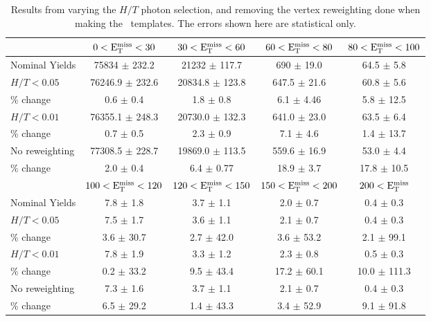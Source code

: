 \begin{table}[htb]
\scriptsize
\begin{center}
\caption{\label{table:photonsystematics} Results from varying the $H/T$ photon selection, and removing the vertex reweighting done when making the \MET\ templates. 
The errors shown here are statistical only.}
\begin{tabular}{l|c|c|c|c}
\hline
\hline
               & $0 < \rm{E_{T}^{miss}} < 30$     & $30 < \rm{E_{T}^{miss}} < 60$  & $60 < \rm{E_{T}^{miss}} < 80$ & $80 < \rm{E_{T}^{miss}} < 100$  \\ 
\hline
Nominal Yields & 75834 $\pm$ 232.2 & 21232   $\pm$ 117.7 & 690 $\pm$ 19.0   & 64.5 $\pm$ 5.8 \\
\hline
$H/T < 0.05$   & 76246.9 $\pm$ 232.6 & 20834.8 $\pm$ 123.8 &  647.5 $\pm$ 21.6 &    60.8 $\pm$ 5.6 \\
\% change      & 0.6 $\pm$ 0.4 &    1.8 $\pm$ 0.8 &    6.1 $\pm$ 4.46 &   5.8 $\pm$ 12.5 \\
\hline
$H/T < 0.01$   & 76355.1 $\pm$ 248.3 & 20730.0 $\pm$ 132.3 &  641.0 $\pm$ 23.0 &    63.5 $\pm$ 6.4 \\
\% change      & 0.7 $\pm$ 0.5 &    2.3 $\pm$ 0.9 &    7.1 $\pm$ 4.6 &   1.4 $\pm$ 13.7 \\
\hline
No reweighting & 77308.5 $\pm$ 228.7 & 19869.0 $\pm$ 113.5 &  559.6 $\pm$ 16.9 &    53.0 $\pm$ 4.4 \\
\% change      & 2.0 $\pm$ 0.4 &    6.4 $\pm$ 0.77 &   18.9 $\pm$ 3.7 &  17.8 $\pm$ 10.5 \\
\hline
\hline
          & $100 < \rm{E_{T}^{miss}} < 120$  & $120 < \rm{E_{T}^{miss}} < 150$  & $150 < \rm{E_{T}^{miss}} < 200$  &    $200 < \rm{E_{T}^{miss}}$  \\ 
\hline
Nominal Yields & 7.8 $\pm$ 1.8 &     3.7 $\pm$ 1.1 &     2.0 $\pm$ 0.7 &     0.4 $\pm$ 0.3 \\
\hline
$H/T < 0.05$   & 7.5 $\pm$ 1.7 &     3.6 $\pm$ 1.1 &     2.1 $\pm$ 0.7 &     0.4 $\pm$ 0.3  \\
\% change      & 3.6 $\pm$ 30.7 &   2.7 $\pm$ 42.0 &   3.6 $\pm$ 53.2 &   2.1 $\pm$ 99.1 \\
\hline
$H/T < 0.01$   & 7.8 $\pm$ 1.9 &     3.3 $\pm$ 1.2 &     2.3 $\pm$ 0.8 &     0.5 $\pm$ 0.3 \\
\% change      & 0.2 $\pm$ 33.2 &   9.5 $\pm$ 43.4 &  17.2 $\pm$ 60.1 & 10.0 $\pm$ 111.3 \\
\hline
No reweighting & 7.3 $\pm$ 1.6 &     3.7 $\pm$ 1.1 &     2.1 $\pm$ 0.7 &     0.4 $\pm$ 0.3 \\
\% change      & 6.5 $\pm$ 29.2 &   1.4 $\pm$ 43.3 &   3.4 $\pm$ 52.9 &   9.1 $\pm$ 91.8 \\
\hline
\hline
\end{tabular}
\end{center}
\end{table} 


